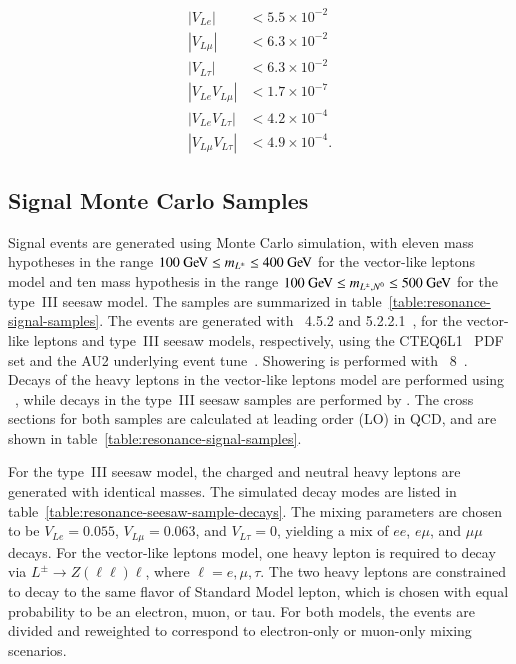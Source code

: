 \begin{align}
|V_{L e}| & <5.5\times10^{-2}\\
|V_{L \mu}| & <6.3\times10^{-2}\\
|V_{L \tau}| & <6.3\times10^{-2}\\
|V_{L e}V_{L\mu}| & <1.7\times10^{-7}\\
|V_{L e}V_{L\tau}| & <4.2\times10^{-4}\\
|V_{L \mu}V_{L\tau}| & <4.9\times10^{-4}.
\end{align}

\subsection{Signal Monte Carlo Samples}\label{sec:resonance-signal-mc-samples}

Signal events are generated using Monte Carlo simulation, with eleven mass hypotheses in the range $100 \GeV \leq m_{\lpm} \leq 400 \GeV$ for the vector-like leptons model and ten mass hypothesis in the range $100 \GeV \leq m_{\lpm,\lzero}\leq 500 \GeV$ for the type~III seesaw model. The samples are summarized in table~\ref{table:resonance-signal-samples}. The events are generated with \madgraph~4.5.2 and 5.2.2.1~\cite{madgraph}, for the vector-like leptons and type~III seesaw models, respectively, using the CTEQ6L1~\cite{ct6l1} PDF set and the AU2 underlying event tune~\cite{AU2}. Showering is performed with \pythia\ 8~\cite{Sjostrand:2008bk}. Decays of the heavy leptons in the vector-like leptons model are performed using \bridge~\cite{bridge}, while decays in the type~III seesaw samples are performed by \madgraph. The cross sections for both samples are calculated at leading order (LO) in QCD, and are shown in table~\ref{table:resonance-signal-samples}. 

For the type~III seesaw model, the charged and neutral heavy leptons are generated with identical masses. The simulated decay modes are listed in table~\ref{table:resonance-seesaw-sample-decays}. The mixing parameters are chosen to be $V_{L e}=0.055$, $V_{L\mu}=0.063$, and $V_{L\tau}=0$, yielding a mix of $ee$, $e\mu$, and $\mu\mu$ decays. For the vector-like leptons model, one heavy lepton is required to decay via $L^{\pm}\rightarrow Z(\ell\ell)\ell$, where $\ell=e,\mu,\tau$. The two heavy leptons are constrained to decay to the same flavor of Standard Model lepton, which is chosen with equal probability to be an electron, muon, or tau. For both models, the events are divided and reweighted to correspond to electron-only or muon-only mixing scenarios. 

